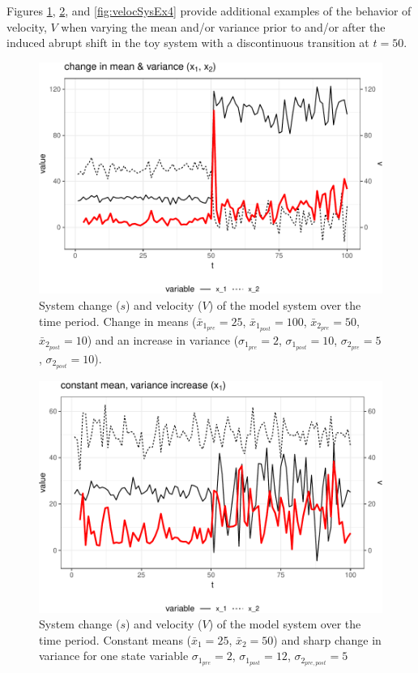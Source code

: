 \documentclass[12pt,twoside,openany]{reedthesis}
\begin{document}
Figures \ref{fig:velocSysEx2}, \ref{fig:velocSysEx3}, and \ref{fig:velocSysEx4} provide additional examples of the behavior of velocity, \(V\) when varying the mean and/or variance prior to and/or after the induced abrupt shift in the toy system with a discontinuous transition at \(t=50\).
\begin{figure}[bth]

{\centering \includegraphics[width=0.85\linewidth]{_myDissertation_files/figure-latex/velocSysEx2-1} 

}

\caption{System change ($s$) and velocity ($V$) of the model system over the time period. Change in means ($\bar{x}_{1_{pre}}=25$, $\bar{x}_{1_{post}}=100$, $\bar{x}_{2_{pre}}=50$, $\bar{x}_{2_{post}}=10$) and an increase in variance ($\sigma_{1_{pre}}=2$, $\sigma_{1_{post}}=10$, $\sigma_{2_{pre}}=5$,  $\sigma_{2_{post}}=10$).}\label{fig:velocSysEx2}
\end{figure}
\newpage
\begin{figure}[bth]

{\centering \includegraphics[width=0.85\linewidth]{_myDissertation_files/figure-latex/velocSysEx3-1} 

}

\caption{System change ($s$) and velocity ($V$) of the model system over the time period. Constant means ($\bar{x}_1=25$, $\bar{x}_2=50$) and sharp change in variance for one state variable $\sigma_{1_{pre}} = 2$, $\sigma_{1_{post}} = 12$, $\sigma_{2_{pre,post}} = 5$}\label{fig:velocSysEx3}
\end{figure}
\end{document}
